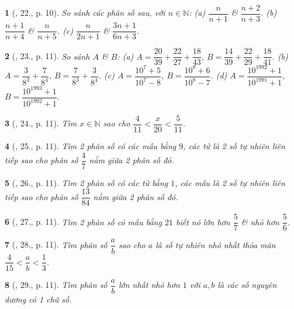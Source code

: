 \documentclass{article}
\newtheorem{baitoan}{}
\begin{document}
\begin{baitoan}[\cite{Binh_Toan_6_tap_2}, 22., p. 10]
	So sánh các phân số sau, với $n\in\mathbb{N}$: (a) $\dfrac{n}{n + 1}$ \& $\dfrac{n + 2}{n + 3}$. (b) $\dfrac{n + 1}{n + 4}$ \& $\dfrac{n}{n + 5}$. (c) $\dfrac{n}{2n + 1}$ \& $\dfrac{3n + 1}{6n + 3}$.
\end{baitoan}

\begin{baitoan}[\cite{Binh_Toan_6_tap_2}, 23., p. 11]
	So sánh $A$ \& $B$: (a) $A = \dfrac{20}{39} + \dfrac{22}{27} + \dfrac{18}{43}$, $B = \dfrac{14}{39} + \dfrac{22}{29} + \dfrac{18}{41}$. (b) $A = \dfrac{3}{8^3} + \dfrac{7}{8^4}$, $B = \dfrac{7}{8^3} + \dfrac{3}{8^4}$. (c) $A = \dfrac{10^7 + 5}{10^7 - 8}$, $B = \dfrac{10^8 + 6}{10^8 - 7}$. (d) $A = \dfrac{10^{1992} + 1}{10^{1991} + 1}$, $B = \dfrac{10^{1993} + 1}{10^{1992} + 1}$.
\end{baitoan}

\begin{baitoan}[\cite{Binh_Toan_6_tap_2}, 24., p. 11]
	Tìm $x\in\mathbb{N}$ sao cho $\dfrac{4}{11} < \dfrac{x}{20} < \dfrac{5}{11}$.
\end{baitoan}

\begin{baitoan}[\cite{Binh_Toan_6_tap_2}, 25., p. 11]
	Tìm 2 phân số có các mẫu bằng $9$, các tử là 2 số tự nhiên liên tiếp sao cho phân số $\dfrac{4}{7}$ nằm giữa 2 phân số đó.
\end{baitoan}

\begin{baitoan}[\cite{Binh_Toan_6_tap_2}, 26., p. 11]
	Tìm 2 phân số có các tử bằng $1$, các mẫu là 2 số tự nhiên liên tiếp sao cho phân số $\dfrac{13}{84}$ nằm giữa 2 phân số đó.
\end{baitoan}

\begin{baitoan}[\cite{Binh_Toan_6_tap_2}, 27., p. 11]
	Tìm 2 phân số có mẫu bằng $21$ biết nó lớn hơn $\dfrac{5}{7}$ \& nhỏ hơn $\dfrac{5}{6}$.
\end{baitoan}

\begin{baitoan}[\cite{Binh_Toan_6_tap_2}, 28., p. 11]
	Tìm phân số $\dfrac{a}{b}$ sao cho $a$ là số tự nhiên nhỏ nhất thỏa mãn $\dfrac{4}{15} < \dfrac{a}{b} < \dfrac{1}{3}$.
\end{baitoan}

\begin{baitoan}[\cite{Binh_Toan_6_tap_2}, 29., p. 11]
	Tìm phân số $\dfrac{a}{b}$ lớn nhất nhỏ hơn $1$ với $a,b$ là các số nguyên dương có 1 chữ số.
\end{baitoan}
\end{document}
